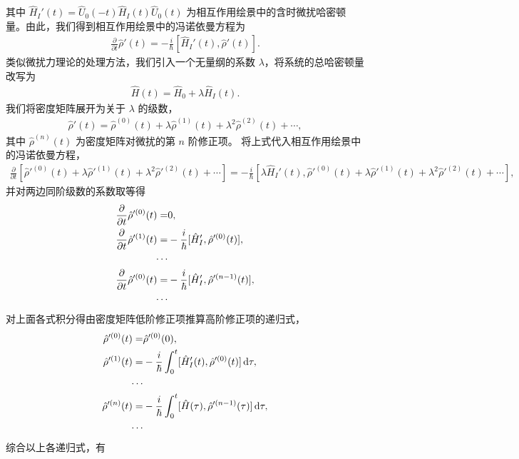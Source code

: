 \documentclass{thesis}
\begin{document}
其中 $\hat{H}_I'(t)=\hat{U}_0(-t)\hat{H}_I(t)\hat{U}_0(t)$ 为相互作用绘景中的含时微扰哈密顿量。由此，我们得到相互作用绘景中的冯诺依曼方程为
\begin{align}
    \frac{\partial}{\partial t}\hat{\rho}'(t)=-\frac{i}{\hbar}[\hat{H}_I'(t),\hat{\rho}'(t)].
\end{align}
类似微扰力理论的处理方法，我们引入一个无量纲的系数 $\lambda$，将系统的总哈密顿量改写为
\begin{align}
    \hat{H}(t)=\hat{H}_0+\lambda\hat{H}_I(t).
\end{align}
我们将密度矩阵展开为关于 $\lambda$ 的级数，
\begin{align}
    \hat{\rho}'(t)=\hat{\rho}^{(0)}(t)+\lambda\hat{\rho}^{(1)}(t)+\lambda^2\hat{\rho}^{(2)}(t)+\cdots,
\end{align}
其中 $\hat{\rho}^{(n)}(t)$ 为密度矩阵对微扰的第 $n$ 阶修正项。
将上式代入相互作用绘景中的冯诺依曼方程，
\begin{align}
    \frac{\partial}{\partial t}[\hat{\rho}'^{(0)}(t)+\lambda\hat{\rho}'^{(1)}(t)+\lambda^2\hat{\rho}'^{(2)}(t)+\cdots]=-\frac{i}{\hbar}[\lambda\hat{H}_I'(t),\hat{\rho}'^{(0)}(t)+\lambda\hat{\rho}'^{(1)}(t)+\lambda^2\hat{\rho}'^{(2)}(t)+\cdots],
\end{align}
并对两边同阶级数的系数取等得
\begin{align}
    \frac{\partial}{\partial t}\hat{\rho}'^{(0)}(t)=&0,\\
    \frac{\partial}{\partial t}\hat{\rho}'^{(1)}(t)=&-\frac{i}{\hbar}[\hat{H}_I',\hat{\rho}'^{(0)}(t)],\\
    \notag\cdots&\\
    \frac{\partial}{\partial t}\hat{\rho}'^{(0)}(t)=&-\frac{i}{\hbar}[\hat{H}_I',\hat{\rho}'^{(n-1)}(t)],\\
    \notag\cdots&
\end{align}
对上面各式积分得由密度矩阵低阶修正项推算高阶修正项的递归式，
\begin{align}
    \hat{\rho}'^{(0)}(t)=&\hat{\rho}'^{(0)}(0),\\
    \hat{\rho}'^{(1)}(t)=&-\frac{i}{\hbar}\int_0^t[\hat{H}_I'(t),\hat{\rho}'^{(0)}(t)]\,\mathrm{d}\tau,\\
    \notag\cdots&\\
    \hat{\rho}'^{(n)}(t)=&-\frac{i}{\hbar}\int_0^t[\hat{H}(\tau),\hat{\rho}'^{(n-1)}(\tau)]\,\mathrm{d}\tau,\\
    \notag\cdots&
\end{align}
综合以上各递归式，有
\end{document}
